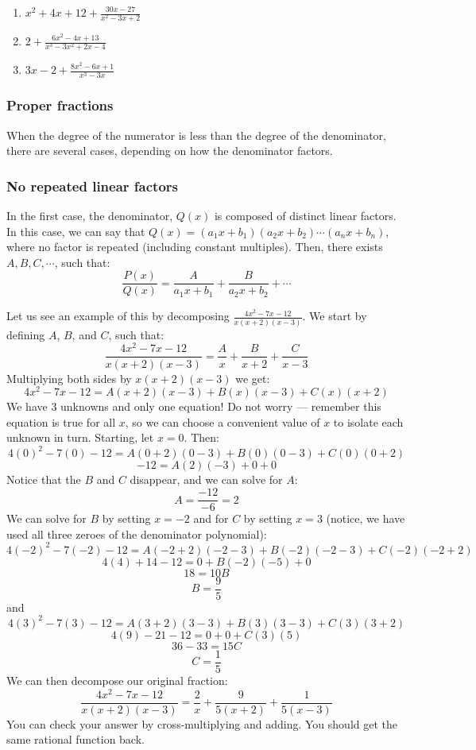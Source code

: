 \begin{Answer}[ref = improper]
\begin{enumerate}
\item $x^2 + 4x + 12 + \frac{30x - 27}{x^2 - 3x + 2}$
\item $2 + \frac{6x^2 - 4x + 13}{x^3 - 3x^2 + 2x - 4}$
\item $3x - 2 + \frac{8x^2 - 6x + 1}{x^3 - 3x}$
\end{enumerate}
\end{Answer}

\subsubsection{Proper fractions}
When the degree of the numerator is less than the degree of the
denominator, there are several cases, depending on how the denominator
factors. 

\subsubsection{No repeated linear factors}
In the first case, the denominator, $Q(x)$ is composed of distinct linear 
factors. In this case, we can say that $Q(x) = (a_1x + b_1)(a_2x + b_2) \cdots 
(a_nx + b_n)$, where no factor is repeated (including constant multiples). 
Then, there exists $A, B, C, \cdots$, such that:
$$\frac{P(x)}{Q(x)} = \frac{A}{a_1x+b_1} + \frac{B}{a_2x + b_2} + \cdots$$

Let us see an example of this by decomposing $\frac{4x^2 - 7x - 12}{x (x + 2) (x 
- 3)}$. We start by defining $A$, $B$, and $C$, such that:
$$\frac{4x^2 - 7x - 12}{x (x + 2) (x - 3)} = \frac{A}{x} + \frac{B}{x + 2} + 
\frac{C}{x - 3}$$
Multiplying both sides by $x (x + 2) (x - 3)$ we get:
$$4x^2 - 7x - 12 = A(x + 2)(x - 3) + B(x)(x - 3) + C(x)(x + 2)$$
We have 3 unknowns and only one equation! Do not worry --- remember this equation 
is true for all $x$, so we can choose a convenient value of $x$ to isolate 
each unknown in turn. Starting, let $x = 0$. Then:
$$4(0)^2 - 7(0) - 12 = A(0 + 2)(0 - 3) + B(0)(0 - 3) + C(0)(0 + 2)$$
$$-12 = A(2)(-3) + 0 + 0$$
Notice that the $B$ and $C$ disappear, and we can solve for $A$:
$$A = \frac{-12}{-6} = 2$$
We can solve for $B$ by setting $x = -2$ and for $C$ by setting $x = 3$ 
(notice, we have used all three zeroes of the denominator polynomial):
$$4(-2)^2 - 7(-2) - 12 = A(-2 + 2)(-2 - 3) + B(-2)(-2 - 3) + C(-2)(-2 + 2)$$
$$4(4) + 14 - 12 = 0 + B(-2)(-5) + 0$$
$$18 = 10B$$
$$B = \frac{9}{5}$$
and
$$4(3)^2 - 7(3) - 12 = A(3 + 2)(3 - 3) + B(3)(3 - 3) + C(3)(3 + 2)$$
$$4(9) - 21 - 12 = 0 + 0 + C(3)(5)$$
$$36 - 33 = 15C$$
$$C = \frac{1}{5}$$
We can then decompose our original fraction:
$$\frac{4x^2 - 7x - 12}{x (x + 2) (x - 3)} = \frac{2}{x} + \frac{9}{5(x + 2)} 
+ \frac{1}{5(x - 3)}$$
You can check your answer by cross-multiplying and adding. You should get the 
same rational function back. 

